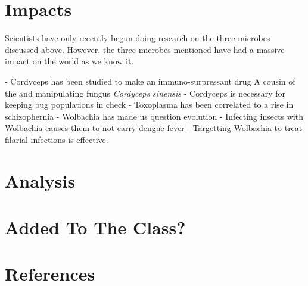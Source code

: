 \documentclass[twocolumn]{article}
\begin{document}
\section*{Impacts}

Scientists have only recently begun doing research on the three microbes discussed above. However, the three microbes mentioned have had a massive impact on the world as we know it. 

- Cordyceps has been studied to make an immuno-surpressant drug
A cousin of the and manipulating fungus \textit{Cordyceps sinensis} \cite{medicinal_cordy}
- Cordyceps is necessary for keeping bug populations in check
- Toxoplasma has been correlated to a rise in schizophernia
- Wolbachia has made us question evolution
- Infecting insects with Wolbachia causes them to not carry dengue fever
- Targetting Wolbachia to treat filarial infections is effective.

\section*{Analysis}

\section*{Added To The Class?}

\section*{References}

\printbibliography
\end{document}
